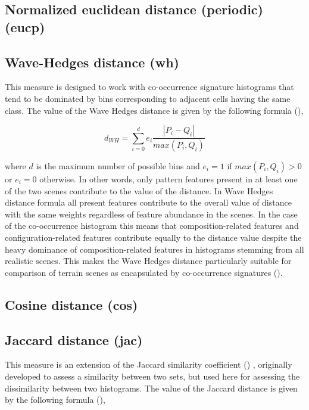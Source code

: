 \subsection{Normalized euclidean distance (periodic) (eucp)}

\subsection{Wave-Hedges distance (wh)}

This measure is designed to work with co-occurrence signature histograms that tend to be dominated by bins corresponding to adjacent cells having the same class. 
The value of the Wave Hedges distance is given by the following formula (\cite{Cha2007}),

\begingroup
\begin{equation} \label{eq:wave_hedges}
d_{WH}=\sum\limits_{i=0}^{d}{
 e_i\dfrac{ |P_{i} - Q_{i}|}{max(P_{i},Q_{i})}}
\end{equation}
\endgroup

\noindent where $d$ is the maximum number of possible bins and $e_i = 1$ if $max(P_{i},Q_{i})>0$ or $e_i = 0$ otherwise.
In other words, only pattern features present in at least one of the two scenes contribute to the value of the distance. 
In Wave Hedges distance formula all present features contribute to the overall value of distance with the same weights regardless of feature abundance in the scenes. 
In the case of the co-occurrence histogram this means that composition-related features and configuration-related features contribute equally to the distance value despite the heavy dominance of composition-related features in histograms stemming from all realistic scenes. 
This makes the Wave Hedges distance particularly suitable for comparison of terrain scenes as encapsulated by co-occurrence signatures (\cite{Jasiewicz2014GMRH}).

\subsection{Cosine distance (cos)}


\subsection{Jaccard distance (jac)}

This measure is an extension of the Jaccard similarity coefficient (\cite{Jaccard1908})
, originally developed to assess a similarity between two sets, but used here for assessing the dissimilarity between two histograms. 
The value of the Jaccard distance is given by the following formula (\cite{Cha2007}),

